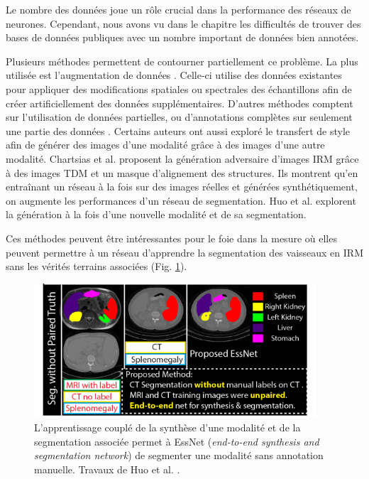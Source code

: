       Le nombre des données joue un rôle crucial dans la performance des réseaux de neurones. Cependant, nous avons vu dans le chapitre \chapContextN{} les difficultés de trouver des bases de données publiques avec un nombre important de données bien annotées. 

      Plusieurs méthodes permettent de contourner partiellement ce problème. La plus utilisée est l'augmentation de données \cite{Liskowski2016_data_augmentation}. Celle-ci utilise des données existantes pour appliquer des modifications spatiales ou spectrales des échantillons afin de créer artificiellement des données supplémentaires. D'autres méthodes comptent sur l'utilisation de données partielles, ou d'annotations complètes sur seulement une partie des données \cite{Tajbakhsh2020_imperfect_datasets}. Certains auteurs ont aussi exploré le transfert de style afin de générer des images d'une modalité grâce à des images d'une autre modalité. Chartsias et al. \cite{Chartsias2017_heart_adversarial_im} proposent la génération adversaire d'images IRM grâce à des images TDM et un masque d'alignement des structures. Ils montrent qu'en entraînant un réseau à la fois sur des images réelles et générées synthétiquement, on augmente les performances d'un réseau de segmentation. Huo et al. \cite{Huo2018_adversarial} explorent la génération à la fois d'une nouvelle modalité et de sa segmentation.

      Ces méthodes peuvent être intéressantes pour le foie dans la mesure où elles peuvent permettre à un réseau d'apprendre la segmentation des vaisseaux en IRM sans les vérités terrains associées (Fig. \ref{fig:ESSNet}).
      \begin{figure}[!ht]
        \centering
        \includegraphics[height=5cm]{Images/ESSNET_application.png}
        \caption{L'apprentissage couplé de la synthèse d'une modalité et de la segmentation associée permet à EssNet (\textit{end-to-end synthesis and segmentation network}) de segmenter une modalité sans annotation manuelle. Travaux de Huo et al. \cite{Huo2018_adversarial}. }
        \label{fig:ESSNet}
      \end{figure}
